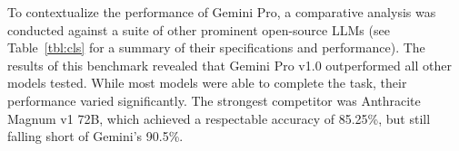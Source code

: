 To contextualize the performance of Gemini Pro, a comparative analysis was conducted against a suite of other prominent open-source LLMs (see Table~\ref{tbl:cls} for a summary of their specifications and performance). The results of this benchmark revealed that Gemini Pro v1.0 outperformed all other models tested. While most models were able to complete the task, their performance varied significantly. The strongest competitor was Anthracite Magnum v1 72B, which achieved a respectable accuracy of 85.25\%, but still falling short of Gemini's 90.5\%.
\begin{table}[tb]
    \captionsetup{skip=5pt}
    \caption{Model Specifications and Performance}
    \label{tbl:cls}
    \centering
\end{table}
